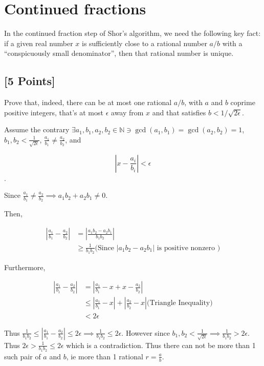 \documentclass[11pt]{article}
\newcommand{\N}{\mathbb{N}}
\newcommand{\abs}[1]{\left\lvert #1\right\rvert}
\begin{document}
\section{Continued fractions} In the continued fraction step of Shor's algorithm, we need the following key fact: if a given real number $x$ is sufficiently close to a rational number $a/b$ with a ``conspicuously small denominator'', then that rational number is unique.  

\subsection{[5 Points]}
Prove that, indeed, there can be at most one rational $a/b$, with $a$ and $b$ coprime positive integers, that's at most $\epsilon$ away from $x$ and that satisfies $b < 1 / \sqrt{2 \epsilon}$.  

\begin{solution}
    Assume the contrary $\exists a_1, b_1, a_2, b_2 \in \N \ni \gcd(a_1, b_1) = \gcd(a_2, b_2) = 1$, $b_1, b_2 < \frac{1}{\sqrt{2 \epsilon}}$, $\frac{a_1}{b_1} \neq \frac{a_2}{b_2}$, and 
    
    \[\abs{x - \frac{a_i}{b_i}} < \epsilon\].

    Since $\frac{a_1}{b_1} \neq \frac{a_2}{b_2} \implies a_1 b_2 + a_2 b_1 \neq 0$. 
    
    Then, 

    \begin{align*}
        \abs{\frac{a_1}{b_1} - \frac{a_2}{b_2}} &= \abs{\frac{a_1 b_2 - a_2 b_1}{b_1 b_2}} \\
        &\geq \frac{1}{b_1 b_2} \text{(Since $\abs{a_1b_2 - a_2b_1}$ is positive nonzero )}
    \end{align*}


    Furthermore, 

    \begin{align*}
        \abs{\frac{a_1}{b_1} - \frac{a_2}{b_2}} &= \abs{\frac{a_1}{b_1} - x + x - \frac{a_2}{b_2}} \\
        &\leq \abs{\frac{a_1}{b_1} - x} + \abs{\frac{a_2}{b_2} - x} \text{(Triangle Inequality)} \\
        &< 2\epsilon
    \end{align*}

    Thus $\frac{1}{b_1 b_2} \leq \abs{\frac{a_1}{b_1} - \frac{a_2}{b_2}} \leq 2\epsilon \implies \frac{1}{b_1 b_2} \leq 2 \epsilon$. However since $b_1, b_2 < \frac{1}{\sqrt{2 \epsilon}} \implies \frac{1}{b_1 b_2} > 2\epsilon$. Thus $2 \epsilon > \frac{1}{b_1 b_2} \leq 2 \epsilon$ which is a contradiction. Thus there can not be more than 1 such pair of $a$ and $b$, ie more than 1 rational $r = \frac{a}{b}$.      
\end{solution}
\end{document}
